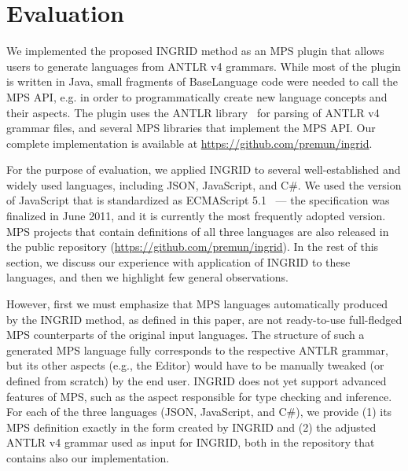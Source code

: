 \section{Evaluation}
\label{sect:EVAL}

We implemented the proposed INGRID method as an MPS plugin that allows users to generate languages from ANTLR v4 grammars.
While most of the plugin is written in Java, small fragments of BaseLanguage code were needed to call  the MPS API,   e.g. in order to programmatically create new language concepts and their aspects.
The plugin uses the ANTLR library~\cite{ref:ANTLR} for parsing of ANTLR v4 grammar files, and several MPS libraries that implement the MPS API.
Our complete implementation is available at \url{https://github.com/premun/ingrid}.

For the purpose of evaluation, we applied INGRID to several well-established and widely used languages, including JSON, JavaScript, and C\#.
We used the version of JavaScript that is standardized as ECMAScript 5.1~\cite{ref:ECMASCRIPT51} --- the specification was finalized in June 2011, and it is currently the most frequently adopted version.
MPS projects that contain definitions of all three languages are also released in the public repository (\url{https://github.com/premun/ingrid}).
In the rest of this section, we discuss our experience with application of INGRID to these languages, and then we highlight few general observations.

However, first we must emphasize that MPS languages automatically produced by the INGRID method, as defined in this paper, are not ready-to-use full-fledged MPS counterparts of the original input languages.
The structure of such a generated MPS language fully corresponds to the respective ANTLR grammar, but its other aspects (e.g., the Editor) would have to be manually tweaked (or defined from scratch) by the end user.
INGRID does not yet support advanced features of MPS, such as the aspect responsible for type checking and inference.
For each of the three languages (JSON, JavaScript, and C\#), we provide (1) its MPS definition exactly in the form created by INGRID and (2) the adjusted ANTLR v4 grammar used as input for INGRID, both in the repository that contains also our implementation.

